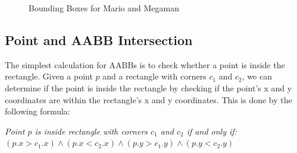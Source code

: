 \begin{figure}[H]
    \begin{center}
    \end{center}

    \caption{Bounding Boxes for Mario and Megaman}
\end{figure}

\subsection{Point and AABB Intersection}

The simplest calculation for AABBs is to check whether a point is inside the
rectangle. Given a point $p$ and a rectangle with corners $c_1$ and $c_2$, we
can determine if the point is inside the rectangle by checking if the point's x
and y coordinates are within the rectangle's x and y coordinates. This is done
by the following formula:
\begin{center}
    \textit{Point $p$ is inside rectangle with corners $c_1$ and $c_2$ if and only if:} \\
    $(p.x > c_1.x) \land (p.x < c_2.x) \land (p.y > c_1.y) \land (p.y < c_2.y)$
\end{center}

